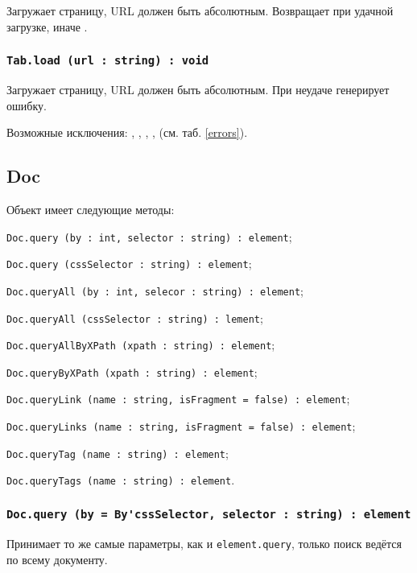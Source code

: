 Загружает страницу, URL должен быть абсолютным. Возвращает \true{} при удачной загрузке, иначе \false.

\subsubsection{\lstinline|Tab.load (url : string) : void|}

Загружает страницу, URL должен быть абсолютным. При неудаче генерирует ошибку.

Возможные исключения: , , , ,  (см. таб. \ref{errors}).

\subsection{{\color{orange} Doc}}

Объект \dom{} имеет следующие методы:
\begin{icItems}
	\item \lstinline|Doc.query (by : int, selector : string) : element|;
	\item \lstinline|Doc.query (cssSelector : string) : element|;
	\item \lstinline|Doc.queryAll (by : int, selecor : string) : element|;
	\item \lstinline|Doc.queryAll (cssSelector : string) : lement|;
	\item \lstinline|Doc.queryAllByXPath (xpath : string) : element|;
	\item \lstinline|Doc.queryByXPath (xpath : string) : element|;
	\item \lstinline|Doc.queryLink (name : string, isFragment = false) : element|;
	\item \lstinline|Doc.queryLinks (name : string, isFragment = false) : element|;
	\item \lstinline|Doc.queryTag (name : string) : element|;
	\item \lstinline|Doc.queryTags (name : string) : element|.
\end{icItems}

\subsubsection{\lstinline|Doc.query (by = By'cssSelector, selector : string) : element|}

Принимает то же самые параметры, как и \lstinline|element.query|, только поиск ведётся по всему документу.

